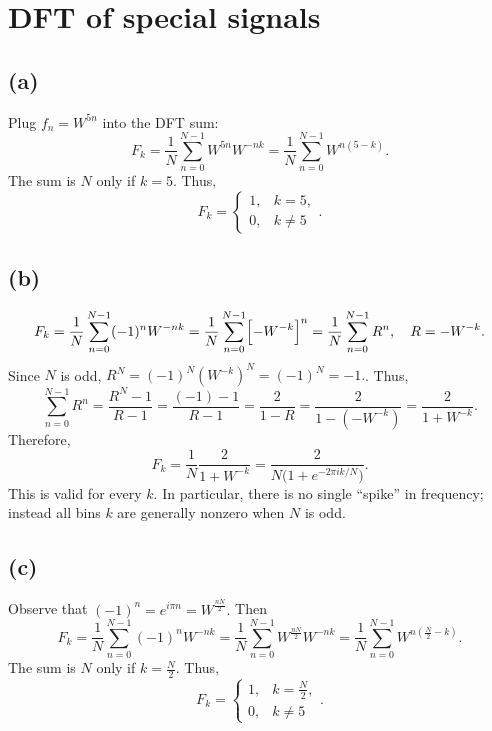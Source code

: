\documentclass{article}
\begin{document}
\newpage
\section{DFT of special signals}
\subsection*{(a)}
Plug $f_n = W^{5n}$ into the DFT sum:
$$
    F_k
    =\frac{1}{N}\sum_{n=0}^{N-1} W^{5n}W^{-nk}
    =\frac{1}{N}\sum_{n=0}^{N-1} W^{n(5-k)}.
$$
The sum is $N$ only if $k=5$. Thus,
$$
    \boxed{
        F_k
        =
        \begin{cases}
            1, & k=5,    \\
            0, & k\neq 5
        \end{cases}
    }.
$$

\subsection*{(b)}
$$
    F_k
    =\frac1N\sum_{n=0}^{N-1}
    (-1)^nW^{-nk}
    =\frac1N\sum_{n=0}^{N-1}
    \Bigl[-W^{-k}\Bigr]^{n}
    =\frac1N\sum_{n=0}^{N-1}R^n,
    \quad
    R = -W^{-k}.
$$
Since $N$ is odd, $R^N=(-1)^N(W^{-k})^N=(-1)^N=-1.$. Thus,
$$
    \sum_{n=0}^{N-1}R^n
    =\frac{R^N-1}{R-1}
    =\frac{(-1)-1}{R-1}
    =\frac{2}{1-R}
    =\frac{2}{1-(-W^{-k})}
    =\frac{2}{1+W^{-k}}.
$$
Therefore,
$$
    \boxed{
    F_k
    = \frac{1}{N}\frac{2}{1+W^{-k}}
    =\frac{2}{N\bigl(1 + e^{-2\pi i k/N}\bigr)}
    }.
$$
This is valid for every $k$.  In particular, there is no single “spike” in frequency; instead all bins $k$ are generally nonzero when $N$ is odd.

\subsection*{(c)}
Observe that $(-1)^n = e^{i\pi n} = W^{\frac{nN}{2}}.$  Then
$$
    F_k
    =\frac1N\sum_{n=0}^{N-1}
    (-1)^nW^{-nk}
    =\frac1N\sum_{n=0}^{N-1} W^{\frac{nN}{2}}W^{-nk}
    =\frac1N\sum_{n=0}^{N-1} W^{n\left(\frac{N}{2}-k\right)}.
$$
The sum is $N$ only if $k=\frac{N}{2}$. Thus,
$$
    \boxed{
        F_k
        =
        \begin{cases}
            1, & k=\frac{N}{2}, \\
            0, & k\neq 5
        \end{cases}
    }.
$$

\newpage
\end{document}
